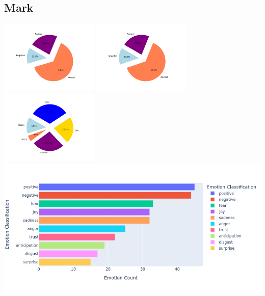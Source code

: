 \documentclass[a4paper,12pt]{article}
\begin{document}
	\subsection{Mark}
	{\includegraphics[height=3.5cm]{marksVaderEmotionalPie.png}}
	{\includegraphics[height=3.5cm]{marksBlobEmotionalPie.png}}
	{\includegraphics[height=3.5cm]{marksEmotionalPie.png}}\\
	{\includegraphics[width=17cm]{markNrcImage.png}}\\
	\clearpage
\end{document}
